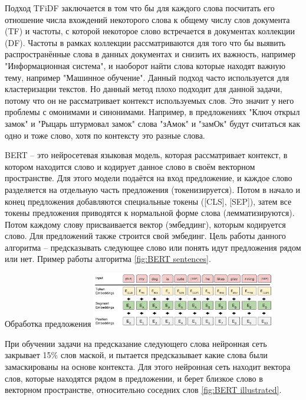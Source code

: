 \documentclass[PI,KR]{HSEUniversity}
\begin{document}
Подход TFiDF заключается в том что бы для каждого слова посчитать его отношение числа вхождений некоторого слова к общему числу слов документа (TF) и частоты, с которой некоторое слово встречается в документах коллекции (DF). Частоты в рамках коллекции рассматриваются для того что бы выявить распространённые слова в данных документах и снизить их важность, например "Информационная система", и наоборот найти слова которые находят важную тему, например "Машинное обучение".  Данный подход часто используется для кластеризации текстов. Но данный метод плохо подходит для данной задачи, потому что он не рассматривает контекст используемых слов. Это значит у него проблемы с омонимами и синонимами. Например, в предложениях "Ключ открыл замок" и "Рыцарь штурмовал замок" слова "зАмок" и "замОк" будут считаться как одно и тоже слово, хотя по контексту это разные слова.

BERT -- это нейросетевая языковая модель, которая рассматривает контекст, в котором находится слово и кодирует данное слово в своём векторном пространстве. Для этого модели подаётся на вход предложение, и каждое слово разделяется на отдельную часть предложения (токенизируется). Потом в начало и конец предложения добавляются специальные токены ([CLS], [SEP]), затем все токены предложения приводятся к нормальной форме слова (лемматизируются). Потом каждому слову присваивается вектор (эмбеддинг), которым кодируется слово. Для предложений также строится свой эмбединг. Цель работы данного алгоритма -- предсказывать следующее слово или понять идут предложения рядом или нет. Пример работы алгоритма \ref{fig:BERT sentences}. 

\begin{FIGURE}[h]{Обработка предложения \label{fig:BERT sentences}}
	\includegraphics[width=0.6\textwidth]{img/BERT sentences}
\end{FIGURE}

При обучении задачи на предсказание следующего слова нейронная сеть закрывает 15\% слов маской, и пытается предсказывает какие слова были замаскированы на основе контекста. Для этого нейронная сеть находит вектора слов, которые находятся рядом в предложении, и берет близкое слово в векторном пространстве, относительно соседних слов \ref{fig:BERT illustrated}. 
\end{document}
